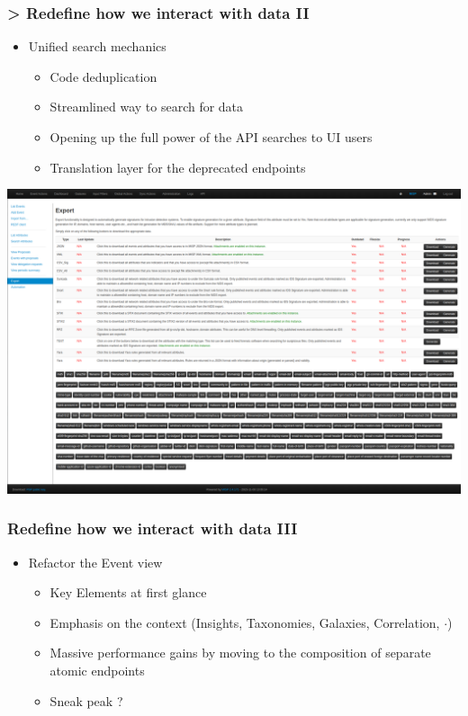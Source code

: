 \begin{frame}
    \frametitle{> Redefine how we interact with data II}
    \begin{itemize}
        \item Unified search mechanics
        \begin{itemize}
            \item Code deduplication
            \item Streamlined way to search for data
            \item Opening up the full power of the API searches to UI users
            \item Translation layer for the deprecated endpoints
        \end{itemize}
    \end{itemize}
    \begin{center}
        \includegraphics[width=0.7\linewidth]{pictures/misp-export.png}
    \end{center}
\end{frame}

\begin{frame}
    \frametitle{Redefine how we interact with data III}
    \begin{itemize}
        \item Refactor the Event view
        \begin{itemize}
            \item Key Elements at first glance
            \item Emphasis on the context (Insights, Taxonomies, Galaxies, Correlation, $\cdot$)
            \item Massive performance gains by moving to the composition of separate atomic endpoints
            \item Sneak peak ? 
        \end{itemize}
    \end{itemize}
\end{frame}

